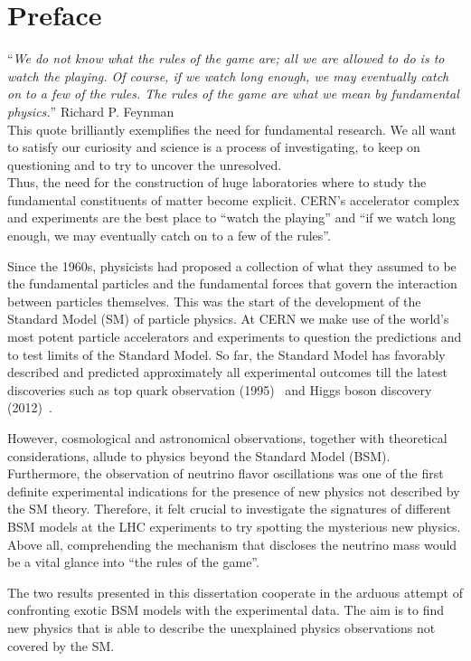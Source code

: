 \chapter*{Preface}\label{chapter:introduction}
\enquote{\itshape {\small We do not know what the rules of the game are; all we are allowed to
do is to watch the playing. Of course, if we watch long enough, we may
eventually catch on to a few of the rules. The rules of the game are
what we mean by fundamental physics.}} Richard P. Feynman\\

This quote brilliantly exemplifies the need for fundamental
research. We all want to satisfy our 
curiosity and science is a process of investigating, to keep on
questioning and to try to uncover the unresolved.\\
Thus, the need for the construction
of huge laboratories where to study the fundamental constituents of
matter become explicit.
CERN's accelerator complex and experiments are the
best place to ``watch the playing'' and ``if we watch long enough, we may
eventually catch on to a few of the rules''.

Since the 1960s, physicists had proposed a collection of what
they assumed to be the fundamental particles and the fundamental forces
 that govern the interaction between particles themselves. This was
 the start of the development of the Standard Model (SM) of particle
 physics. At CERN we make use of the world's
most potent particle accelerators and experiments to question the
predictions and to test limits of the Standard Model. So far,
the Standard Model has favorably described and predicted
approximately all experimental outcomes till the latest
discoveries such as top quark observation (1995)~\cite{Abachi_1995}
and Higgs boson discovery (2012)~\cite{20121,201230}.

However, cosmological and astronomical observations, together with theoretical
considerations, allude to physics beyond the Standard Model
(BSM). Furthermore, the observation of neutrino flavor oscillations was one of the first 
definite experimental indications for the
presence of new physics not described by the SM theory.
 Therefore, it felt crucial to investigate the signatures of different
 BSM models at the LHC
experiments
to try spotting the mysterious new physics. Above all, comprehending the
mechanism that discloses the neutrino mass would be a
vital glance into ``the rules of the game''.

The two results presented in this dissertation cooperate in the arduous attempt of confronting exotic BSM
models with the experimental data. The aim is to find new
physics that is able to describe the unexplained
physics observations not covered by the SM.\\

